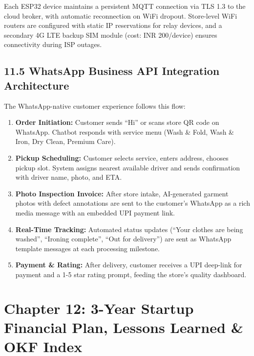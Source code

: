 \documentclass[11pt,a4paper]{article}
\begin{document}
\vspace{0.4cm}
Each ESP32 device maintains a persistent MQTT connection via TLS 1.3 to the cloud broker, with automatic reconnection on WiFi dropout. Store-level WiFi routers are configured with static IP reservations for relay devices, and a secondary 4G LTE backup SIM module (cost: INR 200/device) ensures connectivity during ISP outages.

\subsection{11.5 WhatsApp Business API Integration Architecture}
The WhatsApp-native customer experience follows this flow:

\begin{enumerate}
    \item \textbf{Order Initiation:} Customer sends ``Hi'' or scans store QR code on WhatsApp. Chatbot responds with service menu (Wash \& Fold, Wash \& Iron, Dry Clean, Premium Care).
    \item \textbf{Pickup Scheduling:} Customer selects service, enters address, chooses pickup slot. System assigns nearest available driver and sends confirmation with driver name, photo, and ETA.
    \item \textbf{Photo Inspection Invoice:} After store intake, AI-generated garment photos with defect annotations are sent to the customer's WhatsApp as a rich media message with an embedded UPI payment link.
    \item \textbf{Real-Time Tracking:} Automated status updates (``Your clothes are being washed'', ``Ironing complete'', ``Out for delivery'') are sent as WhatsApp template messages at each processing milestone.
    \item \textbf{Payment \& Rating:} After delivery, customer receives a UPI deep-link for payment and a 1-5 star rating prompt, feeding the store's quality dashboard.
\end{enumerate}

\clearpage

\section{Chapter 12: 3-Year Startup Financial Plan, Lessons Learned \& OKF Index}
\end{document}
